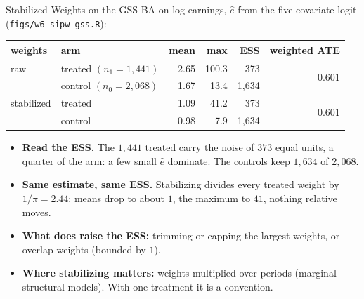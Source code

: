 \documentclass[aspectratio=169,11pt,xcolor=dvipsnames]{beamer}
\begin{document}
\begin{frame}{Stabilized Weights on the GSS}
BA on log earnings, $\hat e$ from the five-covariate logit
{\footnotesize(\texttt{figs/w6\_sipw\_gss.R})}:
\begin{center}\small
\renewcommand{\arraystretch}{1.0}
\begin{tabular}{llrrrr}
\toprule
weights & arm & mean & max & ESS & weighted ATE \\
\midrule
raw        & treated $(n_1 = 1{,}441)$ & 2.65 & 100.3 & 373   & \multirow{2}{*}{0.601} \\
           & control $(n_0 = 2{,}068)$ & 1.67 & 13.4  & 1{,}634 & \\
stabilized & treated             & 1.09 & 41.2  & 373   & \multirow{2}{*}{0.601} \\
           & control             & 0.98 & 7.9   & 1{,}634 & \\
\bottomrule
\end{tabular}
\end{center}
\begin{itemize}\itemsep1pt
  \item \textbf{Read the ESS.} The $1{,}441$ treated carry the noise of
        $373$ equal units, a quarter of the arm: a few small $\hat e$
        dominate. The controls keep $1{,}634$ of $2{,}068$.
  \item \textbf{Same estimate, same ESS.} Stabilizing divides every treated
        weight by $1/\pi = 2.44$: means drop to about $1$, the maximum to
        $41$, nothing relative moves.
  \item \textbf{What does raise the ESS:} trimming or capping the largest
        weights, or overlap weights (bounded by $1$).
  \item \textbf{Where stabilizing matters:} weights multiplied over periods
        (marginal structural models). With one treatment it is a convention.
\end{itemize}
\end{frame}
\end{document}
